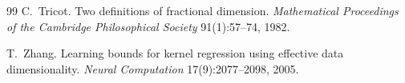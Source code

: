 \documentclass[11pt,a4paper]{article}
\theoremstyle{plain}
\theoremstyle{remark}
\begin{document}
\begin{thebibliography}{99}
 C.~Tricot. Two definitions of fractional dimension. \emph{Mathematical Proceedings of the Cambridge Philosophical Society} 91(1):57--74, 1982.

 T.~Zhang. Learning bounds for kernel regression using effective data dimensionality. \emph{Neural Computation} 17(9):2077--2098, 2005.
\end{thebibliography}
\end{document}
